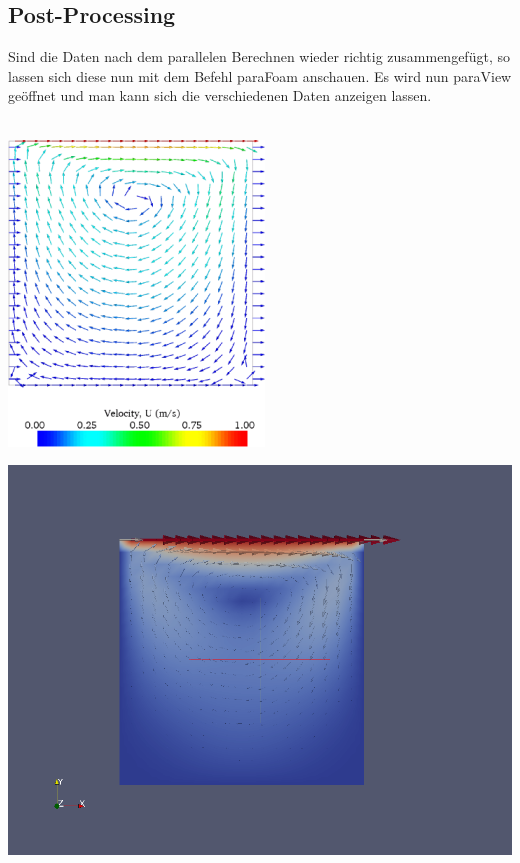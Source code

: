 \begin{refsection}
\subsection{Post-Processing}
Sind die Daten nach dem parallelen Berechnen wieder richtig zusammengefügt, so lassen sich diese nun mit dem Befehl paraFoam anschauen. Es wird nun paraView geöffnet und man kann sich die verschiedenen Daten anzeigen lassen. \\ \\
\begin{minipage}{0.5 \linewidth}
\includegraphics[width = 0.8 \linewidth]{./OpenFOAM/Pics/stroemung.png}
\end{minipage}
\begin{minipage}{0.5 \linewidth}
\includegraphics[width = \linewidth]{./OpenFOAM/Pics/stroemung2.png}

\end{minipage}
\end{refsection}
